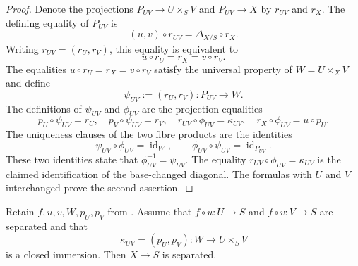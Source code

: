 \begin{proof}
  Denote the projections $P_{UV}\to U\times_SV$ and $P_{UV}\to X$ by
  $r_{UV}$ and $r_X$.  The defining equality of $P_{UV}$ is
  \[
    (u,v)\circ r_{UV}=\Delta_{X/S}\circ r_X.
  \]
  Writing $r_{UV}=(r_U,r_V)$, this equality is equivalent to
  \[
    u\circ r_U=r_X=v\circ r_V.
  \]
  The equalities $u\circ r_U=r_X=v\circ r_V$ satisfy the universal property
  of $W=U\times_XV$ and define
  \[
    \psi_{UV}:=(r_U,r_V)\colon P_{UV}\longrightarrow W.
  \]
  The definitions of $\psi_{UV}$ and $\phi_{UV}$ are the projection
  equalities
  \[
    p_U\circ\psi_{UV}=r_U,
    \quad p_V\circ\psi_{UV}=r_V,
    \quad r_{UV}\circ\phi_{UV}=\kappa_{UV},
    \quad r_X\circ\phi_{UV}=u\circ p_U.
  \]
  The uniqueness clauses of the two fibre products are the identities
  \[
    \psi_{UV}\circ\phi_{UV}=\operatorname{id}_W,
    \qquad
    \phi_{UV}\circ\psi_{UV}=\operatorname{id}_{P_{UV}}.
  \]
  These two identities state that
  $\phi_{UV}^{-1}=\psi_{UV}$.  The equality
  $r_{UV}\circ\phi_{UV}=\kappa_{UV}$ is the claimed identification of the
  base-changed diagonal.
  The formulas with $U$ and $V$ interchanged prove the second assertion.
\end{proof}

\begin{lemma}
  \label{lemma:nagata-separated-two-open-cover}

  Retain $f,u,v,W,p_U,p_V$ from
  .  Assume that
  $f\circ u\colon U\to S$ and $f\circ v\colon V\to S$ are separated and that
  \[
    \kappa_{UV}=(p_U,p_V)\colon W\longrightarrow U\times_SV
  \]
  is a closed immersion.  Then $X\to S$ is separated.
\end{lemma}

